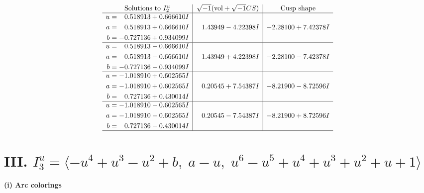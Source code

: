 \documentclass[1p]{elsarticle_modified}
\theoremstyle{definition}
\newcommand{\I}{\sqrt{-1}}
\begin{document}
$$\begin{array}{c|c|c}  
\text{Solutions to }I^u_{2}& \I (\text{vol} + \sqrt{-1}CS) & \text{Cusp shape}\\
 \hline 
\begin{aligned}
u &= \phantom{-}0.518913 + 0.666610 I \\
a &= \phantom{-}0.518913 + 0.666610 I \\
b &= -0.727136 + 0.934099 I\end{aligned}
 & \phantom{-}1.43949 - 4.22398 I & -2.28100 + 7.42378 I \\ \hline\begin{aligned}
u &= \phantom{-}0.518913 - 0.666610 I \\
a &= \phantom{-}0.518913 - 0.666610 I \\
b &= -0.727136 - 0.934099 I\end{aligned}
 & \phantom{-}1.43949 + 4.22398 I & -2.28100 - 7.42378 I \\ \hline\begin{aligned}
u &= -1.018910 + 0.602565 I \\
a &= -1.018910 + 0.602565 I \\
b &= \phantom{-}0.727136 + 0.430014 I\end{aligned}
 & \phantom{-}0.20545 + 7.54387 I & -8.21900 - 8.72596 I \\ \hline\begin{aligned}
u &= -1.018910 - 0.602565 I \\
a &= -1.018910 - 0.602565 I \\
b &= \phantom{-}0.727136 - 0.430014 I\end{aligned}
 & \phantom{-}0.20545 - 7.54387 I & -8.21900 + 8.72596 I\\
 \hline 
 \end{array}$$\newpage\newpage\renewcommand{\arraystretch}{1}
\centering \section*{III. $I^u_{3}= \langle - u^4+u^3- u^2+b,\;a- u,\;u^6- u^5+u^4+u^3+u^2+u+1 \rangle$}
\flushleft \textbf{(i) Arc colorings}\\
\end{document}
